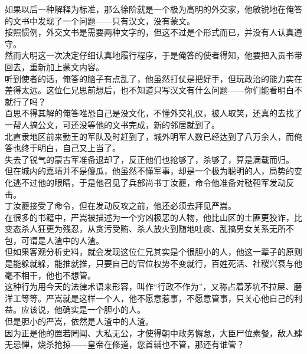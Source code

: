 \begin{multicols}{\theparacolNo}
如果以后一种解释为标准，那么徐阶就是一个极为高明的外交家，他敏锐地在俺答的文书中发现了一个问题——只有汉文，没有蒙文。\\

按照惯例，外交文书是需要两种文字的，但这不过是个形式而已，并没有人认真遵守。\\

然而大明这一次决定仔细认真地履行程序，于是俺答的使者得知，他要把入贡书带回去，重新加上蒙文内容。\\

听到使者的话，俺答的脑子有点乱了，他虽然打仗是把好手，但玩政治的能力实在差得太远。这位仁兄思前想后，也不知道只写汉文有什么问题——你们能看明白不就行了吗？\\

百思不得其解的俺答唯恐自己是没文化，不懂外交礼仪，被人取笑，还真的去找了一帮人搞公文，可还没等他的文书完成，新的邻居就到了。\\

北直隶地区前来勤王的军队及时赶到了，城外明军人数已经达到了八万余人，而俺答也终于明白，自己又上当了。\\

失去了锐气的蒙古军准备退却了，反正他们也抢够了，杀够了，算是满载而归。\\

但在城内的嘉靖并不是傻瓜，他虽然不懂军事，却是一个极为聪明的人，局势的变化逃不过他的眼睛，于是他召见了兵部尚书丁汝夔，命令他准备对鞑靼军发动反击。\\

丁汝夔接受了命令，但在发动反攻之前，他还必须去拜见严嵩。\\

在很多的书籍中，严嵩被描述为一个穷凶极恶的人物，他比山区的土匪更狡诈，比变态杀人狂更为残忍，从贪污受贿、杀人放火到随地吐痰、乱搞男女关系无所不包，可谓是人渣中的人渣。\\

但如果客观分析史料，就会发现这位仁兄其实是个很胆小的人，他这一辈子的原则是能躲就躲，能推就推，只要自己的官位权势不变就行，百姓死活、社稷兴衰与他毫不相干，他也不想管。\\

这种行为用今天的法律术语来形容，叫作“行政不作为”，又称占着茅坑不拉屎、磨洋工等等。严嵩就是这样一个人，他不愿意惹事，不愿意管事，只关心他自己的利益。应该说，他确实是一个胆小的人。\\

但是胆小的严嵩，依然是人渣中的人渣。\\

因为正是他的置若罔闻、大私无公，才使得朝中政务懈怠，大臣尸位素餐，敌人肆无忌惮，烧杀抢掠——皇帝在修道，您首辅也不管，那还有谁管？\\


\end{multicols}
